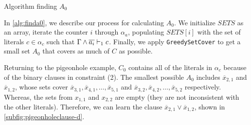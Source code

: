 \begin{algorithm}
    \caption{Algorithm finding $A_0$}\label{alg:finda0}
    \SetAlgoNoLine
\end{algorithm}

In \autoref{alg:finda0}, we describe our process for calculating $A_0$. 
We initialize $SETS$ as an array, iterate the counter
$i$ through $\alpha_a$, populating $SETS[i]$ with the set of literals
$c \in \alpha_c$ such that $\Gamma \land \overline{a_i} \vdash_1 c$. Finally, we apply
\texttt{GreedySetCover} to get a small set $A_0$ that covers as much of $C$ as possible.

Returning to the pigeonhole example, 
$C_0$ contains all of the literals in $\alpha_c$ because of the binary clauses in constraint (2). 
The smallest possible $A_0$ includes $\overline{x}_{2, 1}$ and $\overline{x}_{1, 2}$, whose 
sets cover $\overline{x}_{3, 1}, \overline{x}_{4, 1},  \ldots, \overline{x}_{5,
1}$ and $\overline{x}_{3, 2}, \overline{x}_{4, 2},  \ldots, \overline{x}_{5,
2}$ respectively. 
Whereas, the sets from $x_{1, 1}$ and $x_{2, 2}$ are empty (they are not inconsistent with the other literals).
Therefore, we can learn the clause $\overline{x}_{2, 1} \lor \overline{x}_{1, 2}$, shown in 
\autoref{subfig:pigeonholeclause-d}.





